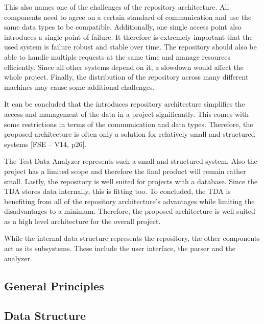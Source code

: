 This also names one of the challenges of the repository architecture. All components need to agree on a certain standard of communication and use the same data types to be compatible. Additionally, one single access point also introduces a single point of failure. It therefore is extremely important that the used system is failure robust and stable over time. The repository should also be able to handle multiple requests at the same time and manage resources efficiently. Since all other systems depend on it, a slowdown would affect the whole project. Finally, the distribution of the repository across many different machines may cause some additional challenges.

It can be concluded that the introduces repository architecture simplifies the access and management of the data in a project significantly. This comes with some restrictions in terms of the communication and data types. Therefore, the proposed architecture is often only a solution for relatively small and structured systems [FSE – V14, p26].

The Test Data Analyzer represents such a small and structured system. Also the project has a limited scope and therefore the final product will remain rather small. Lastly, the repository is well suited for projects with a database. Since the TDA stores data internally, this is fitting too. To concluded, the TDA is benefiting from all of the repository architecture's advantages while limiting the disadvantages to a minimum. Therefore, the proposed architecture is well suited as a high level architecture for the overall project.

While the internal data structure represents the repository, the other components act as its subsystems. These include the user interface, the parser and the analyzer. 

\subsection{General Principles}


\subsection{Data Structure}\label{sec:data_structures}
